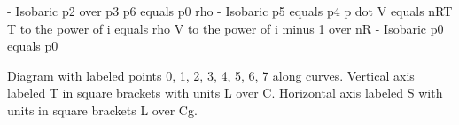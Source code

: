 - Isobaric p2 over p3  
p6 equals p0 rho  
- Isobaric p5 equals p4  
p dot V equals nRT  
T to the power of i equals rho V to the power of i minus 1 over nR  
- Isobaric p0 equals p0  

Diagram with labeled points 0, 1, 2, 3, 4, 5, 6, 7 along curves.  
Vertical axis labeled T in square brackets with units L over C.  
Horizontal axis labeled S with units in square brackets L over Cg.